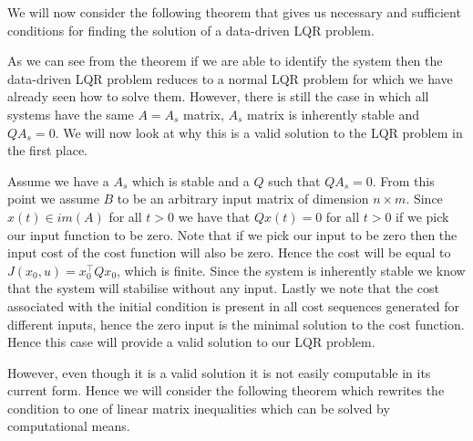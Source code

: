 We will now consider the following theorem that gives us necessary and sufficient conditions for finding the solution of a data-driven LQR problem.


As we can see from the theorem if we are able to identify the system then the data-driven LQR problem reduces to a normal LQR problem for which we have already seen how to solve them. However, there is still the case in which all systems have the same $A = A_s$ matrix, $A_s$ matrix is inherently stable and $QA_s = 0$. We will now look at why this is a valid solution to the LQR problem in the first place.

Assume we have a $A_s$ which is stable and a $Q$ such that $QA_s = 0$. From this point we assume $B$ to be an arbitrary input matrix of dimension $n \times m$. Since $x(t) \in im(A)$ for all $t > 0$ we have that $Qx(t) = 0$ for all $t>0$ if we pick our input function to be zero. Note that if we pick our input to be zero then the input cost of the cost function will also be zero. Hence the cost will be equal to $J(x_0 , u) = x_0^\top Q x_0$, which is finite. Since the system is inherently stable we know that the system will stabilise without any input. Lastly we note that the cost associated with the initial condition is present in all cost sequences generated for different inputs, hence the zero input is the minimal solution to the cost function. Hence this case will provide a valid solution to our LQR problem.

However, even though it is a valid solution it is not easily computable in its current form. Hence we will consider the following theorem which rewrites the condition to one of linear matrix inequalities which can be solved by computational means.

